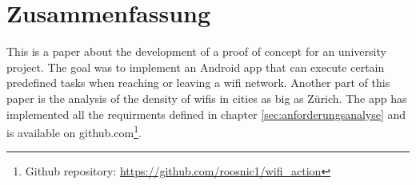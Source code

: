 \thispagestyle{empty}
\chapter*{Zusammenfassung}
\label{sec:Zusammenfassung}
This is a paper about the development of a proof of concept for an university project. The goal was to implement an Android app that can execute certain predefined tasks when reaching or leaving a wifi network. Another part of this paper is the analysis of the density of wifis in cities as big as Zürich. The app has implemented all the requirments defined in chapter \ref{sec:anforderungsanalyse} and is available on github.com\footnote{Github repository: \url{https://github.com/roosnic1/wifi_action}}.